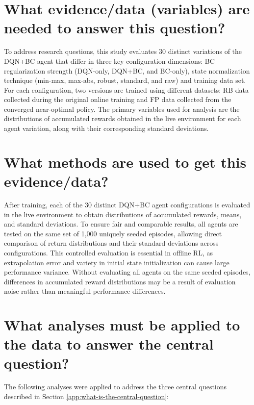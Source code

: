 \section{What evidence/data (variables) are needed to answer this question?}
To address research questions, this study evaluates 30 distinct variations of the DQN+BC agent that differ in three key configuration dimensions: BC regularization strength (DQN-only, DQN+BC, and BC-only), state normalization technique (min-max, max-abs, robust, standard, and raw) and training data set. For each configuration, two versions are trained using different datasets: RB data collected during the original online training and FP data collected from the converged near-optimal policy. The primary variables used for analysis are the distributions of accumulated rewards obtained in the live environment for each agent variation, along with their corresponding standard deviations.





\section{What methods are used to get this evidence/data?}
After training, each of the 30 distinct DQN+BC agent configurations is evaluated in the live environment to obtain distributions of accumulated rewards, means, and standard deviations. To ensure fair and comparable results, all agents are tested on the same set of 1,000 uniquely seeded episodes, allowing direct comparison of return distributions and their standard deviations across configurations. This controlled evaluation is essential in offline RL, as extrapolation error and variety in initial state initialization can cause large performance variance. Without evaluating all agents on the same seeded episodes, differences in accumulated reward distributions may be a result of evaluation noise rather than meaningful performance differences.




\section{What analyses must be applied to the data to answer the central question?}
The following analyses were applied to address the three central questions described in Section \ref{app:what-is-the-central-question}:

